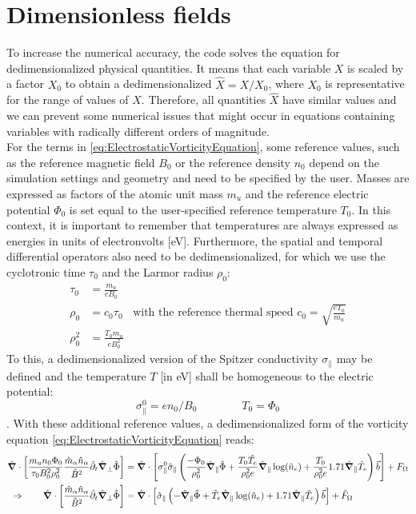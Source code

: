 \section{Dimensionless fields}
\label{sec:DedimensionalizedElectromagneticModelS3X}

To increase the numerical accuracy, the code solves the equation for dedimensionalized physical quantities. It means that each variable $X$ is scaled by a factor $X_0$ to obtain a dedimensionalized $\hat{X} = X/X_0$, where $X_0$ is representative for the range of values of $X$. Therefore, all quantities $\hat{X}$ have similar values and we can prevent some numerical issues that might occur in equations containing variables with radically different orders of magnitude. \\


For the terms in \autoref{eq:ElectrostaticVorticityEquation}, some reference values, such as the reference magnetic field $B_0$ or the reference density $n_0$ depend on the simulation settings and geometry and need to be specified by the user. Masses are expressed as factors of the atomic unit mass $m_u$ and the reference electric potential $\Phi_0$ is set equal to the user-specified reference temperature $T_0$. In this context, it is important to remember that temperatures are always expressed as energies in units of electronvolts [eV]. Furthermore, the spatial and temporal differential operators also need to be dedimensionalized, for which we use the cyclotronic time $\tau_0$ and the Larmor radius $\rho_0$:
\begin{align}
	\tau_0 &= \frac{m_u}{eB_0} \nonumber \\
	\rho_0 &= c_0 \tau_0 & \text{with the reference thermal speed } c_0 = \sqrt{\frac{eT_0}{m_u}} \nonumber \\
	\rho_0^2 &= \frac{T_0m_u}{eB_0^2} \nonumber
\end{align}
To this, a dedimensionalized version of the Spitzer conductivity $\sigma_\parallel$ may be defined and the temperature $T$ [in eV] shall be homogeneous to the electric potential: $$ \sigma_\parallel^0 = en_0 / B_0 \qquad\qquad T_0 =\Phi_0$$.
With these additional reference values, a dedimensionalized form of the vorticity equation \ref{eq:ElectrostaticVorticityEquation} reads:
\begin{align}
	\hat{\grad}\cdot\left[\frac{m_un_0\Phi_0}{\tau_0B_0^2\rho_0^2}\frac{\hat{m}_\alpha \hat{n}_\alpha}{ \hat{B}^2}\hat{\partial}_t\hat{\grad}_\perp\hat{\Phi}\right] 
	&= \hat{\grad}\cdot\left[\sigma_\parallel^0\hat{\sigma}_\parallel\left(\frac{-\Phi_0}{\rho_0^2}\hat{\grad}_\parallel\hat{\Phi}
	+ \frac{T_0\hat{T_e}}{\rho_0^2e}\hat{\grad}_\parallel\log(\hat{n}_e)
	+ \frac{T_0}{\rho_0^2e}1.71\hat{\grad}_\parallel \hat{T}_e \right)\vec{b}\right] + F_\Omega \nonumber \\
	\Rightarrow \qquad\hat{\grad}\cdot\left[\frac{\hat{m}_\alpha \hat{n}_\alpha}{ \hat{B}^2}\hat{\partial}_t\hat{\grad}_\perp\hat{\Phi}\right]
	&= \hat{\grad}\cdot\left[\hat{\sigma}_\parallel\left(
	- \hat{\grad}_\parallel\hat{\Phi}
	+ \hat{T}_e\hat{\grad}_\parallel\log(\hat{n}_e)
	+ 1.71\hat{\grad}_\parallel \hat{T}_e \right)\vec{b}\right] + \hat{F}_\Omega
	\label{eq:ElectrostaticVorticityEquation_dedimensionalized}
\end{align}


